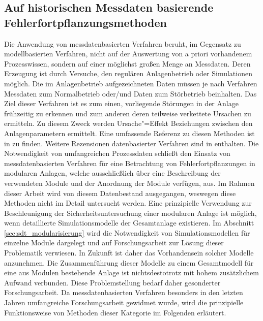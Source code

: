 \subsection{Auf historischen Messdaten basierende Fehlerfortpflanzungsmethoden}\label{sec:fAna_dat}
Die Anwendung von messdatenbasierten Verfahren beruht, im Gegensatz zu modellbasierten Verfahren, nicht auf der Auswertung von a priori vorhandenem Prozesswissen, sondern auf einer m\"oglichst gro\ss{}en Menge an Messdaten. Deren Erzeugung ist durch Versuche, den regul\"aren Anlagenbetrieb oder Simulationen m\"oglich. Die im Anlagenbetrieb aufgezeichneten Daten m\"ussen je nach Verfahren Messdaten zum Normalbetrieb {oder/und} Daten zum St\"orbetrieb beinhalten. Das Ziel dieser Verfahren ist es zum einen, vorliegende St\"orungen in der Anlage fr\"uhzeitig zu erkennen und zum anderen deren teilweise verkettete Ursachen zu ermitteln. Zu diesem Zweck werden Ursache"=Effekt Beziehungen zwischen den Anlagenparametern ermittelt. Eine umfassende Referenz zu diesen Methoden ist in  \cite{Paltrinieri_2016} zu finden. Weitere Rezensionen datenbasierter Verfahren sind in \cite{Venkatasubramanian_2003b, Thornhill_2006, Varga_2013, Yin_2014, Zhang_2017} enthalten.  \newline
Die Notwendigkeit von umfangreichen Prozessdaten schlie\ss{}t den Einsatz von messdatenbasierten Verfahren f\"ur eine Betrachtung von Fehlerfortpflanzungen in modularen Anlagen, welche ausschlie\ss{}lich \"uber eine Beschreibung der verwendeten Module und der Anordnung der Module verf\"ugen, aus. Im Rahmen dieser Arbeit wird von diesem Datenbestand  ausgegangen, weswegen diese Methoden nicht im Detail untersucht werden. \newline
Eine prinzipielle Verwendung zur Beschleunigung der Sicherheitsuntersuchung einer modularen Anlage ist m\"oglich, wenn detaillierte Simulationsmodelle der Gesamtanlage existieren. Im Abschnitt \ref{sec:sdt_modularisierung} wird die Notwendigkeit von Simulationsmodellen f\"ur einzelne Module dargelegt und auf Forschungsarbeit zur L\"osung dieser Problematik verwiesen. In Zukunft ist daher das Vorhandensein solcher Modelle anzunehmen. Die Zusammenf\"uhrung dieser Modelle zu einem Gesamtmodell f\"ur eine aus Modulen bestehende Anlage ist nichtsdestotrotz mit hohem zus\"atzlichem Aufwand verbunden. Diese Problemstellung bedarf daher gesonderter Forschungsarbeit. \newline
Da messdatenbasierten Verfahren besonders in den letzten Jahren umfangreiche Forschungsarbeit gewidmet wurde, wird die prinzipielle Funktionsweise von Methoden dieser Kategorie im Folgenden erl\"autert. 

